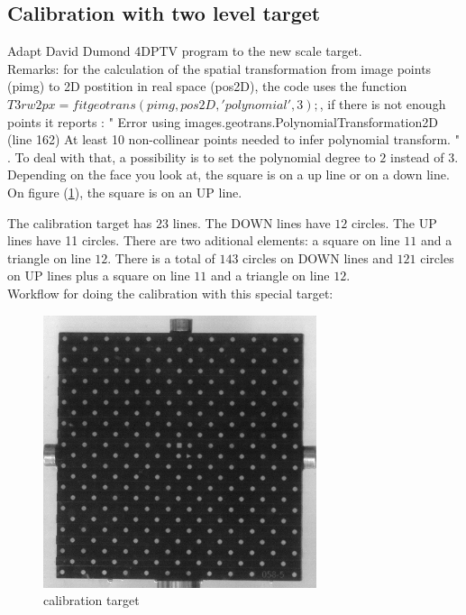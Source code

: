 \documentclass[lineno]{jfm}
\begin{document}
\subsection{Calibration with two level target}

Adapt David Dumond 4DPTV program to the new scale target.\\

Remarks: for the calculation of the spatial transformation from image points (pimg) to 2D postition in real space (pos2D), the code uses the function $T3rw2px  = fitgeotrans(pimg,pos2D,'polynomial',3);$, if there is not enough points it reports : " Error using images.geotrans.PolynomialTransformation2D (line 162)
At least 10 non-collinear points needed to infer polynomial transform. " . To deal with that, a possibility is to set the polynomial degree to $2$ instead of $3$.\\

Depending on the face you look at, the square is on a up line or on a down line. On figure (\ref{fig:caltarget}), the square is on an UP line.

The calibration target has $23$ lines. The DOWN lines have $12$ circles. The UP lines have 11 circles. There are two aditional elements: a square on line $11$ and a triangle on line $12$. There is a total of $143$ circles on DOWN lines and $121$ circles on UP lines plus a square on line $11$ and a triangle on line $12$. \\

Workflow for doing the calibration with this special target: 

\begin{figure}
\includegraphics[height=8cm]{figures/calibrationTarget.png}
\caption{calibration target}
\label{fig:caltarget}
\end{figure}
\end{document}
